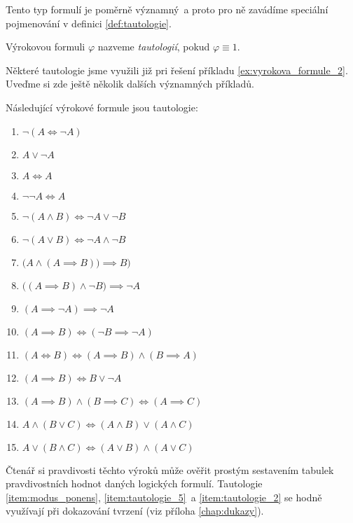 Tento typ formulí je poměrně významný~a proto pro ně zavádíme speciální pojmenování v definici \ref{def:tautologie}.
\begin{definition}[Tautologie]\label{def:tautologie}
    Výrokovou formuli $\varphi$ nazveme \emph{tautologií}, pokud $\varphi\equiv 1$.
\end{definition}

Některé tautologie jsme využili již pri řešení příkladu \ref{ex:vyrokova_formule_2}. Uveďme si zde ještě několik dalších významných příkladů.
\begin{theorem}\label{thm:vyznamne_tautologie}
    Následující výrokové formule jsou tautologie:
    \begin{enumerate}[label=(\roman*)]
        \item\label{item:tautologie_1} $\neg (A \iff \neg A)$
        \item\label{item:zakon_vylouceneho_tretiho} $A \lor \neg A$ 
        \item\label{item:zakon_identity} $A \iff A$ 
        \item\label{item:zakon_dvoji_negace} $\neg\neg A \iff A$ 
        \item\label{item:de_morgan_1} $\neg (A \land B) \iff \neg A \lor \neg B$ 
        \item\label{item:de_morgan_2} $\neg (A \lor B) \iff \neg A \land \neg B$ 
        \item\label{item:modus_ponens} $\bigl(A \land (A \implies B)\bigr) \implies B)$ 
        \item\label{item:modus_tollens_1} $\bigl((A \implies B) \land \neg B\bigr) \implies \neg A$ 
        \item\label{item:reductio_ad_absurdum} $(A \implies \neg A) \implies \neg A$
        \item\label{item:tautologie_5} $(A \implies B) \iff (\neg B \implies \neg A)$
        \item\label{item:tautologie_2} $(A \iff B) \iff (A \implies B) \land (B \implies A)$
        \item\label{item:tautologie_3} $(A \implies B) \iff B \lor \neg A$
        \item\label{item:tautologie_4} $(A \implies B) \land (B \implies C) \iff (A \implies C)$
        \item\label{item:tautologie_6} $A \land (B \lor C) \iff (A \land B) \lor (A \land C)$
        \item\label{item:tautologie_7} $A \lor (B \land C) \iff (A \lor B) \land (A \lor C)$
    \end{enumerate}
\end{theorem}

Čtenář si pravdivosti těchto výroků může ověřit prostým sestavením tabulek pravdivostních hodnot daných logických formulí. Tautologie \ref{item:modus_ponens}, \ref{item:tautologie_5}~a \ref{item:tautologie_2} se hodně využívají při dokazování tvrzení (viz příloha \ref{chap:dukazy}).